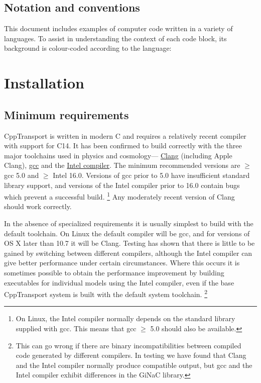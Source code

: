 \documentclass[11pt,a4paper]{article}
\newcommand{\packagefont}{\sffamily}
\newcommand{\GiNaC}{{\packagefont GiNaC}}
\newcommand{\CppTransport}{{\packagefont CppTransport}}
\newcommand{\semibold}[1]{{\fontseries{b}\selectfont{#1}}}
\newcommand{\para}[1]{\par\vspace{2mm}\noindent\semibold{{#1.}---}\ignorespaces}
\newcommand\CC{C\nolinebreak\hspace{-.05em}\raisebox{.4ex}{\relsize{-3}{\textbf{+}}}\nolinebreak\hspace{-.10em}\raisebox{.4ex}{\relsize{-3}{\textbf{+}}}}
\renewcommand{\geq}{\geqslant}
\begin{document}
\subsection{Notation and conventions}
This document includes examples of computer code written in a variety
of languages.
To assist in understanding the context of each code block, its background
is colour-coded according to the language:

\section{Installation}

\subsection{Minimum requirements}

\para{Compiler}
{\CppTransport} is written in modern {\CC} and requires a relatively recent compiler
with support for {\CC}14.
It has been confirmed to build
correctly with the three major toolchains used in physics and cosmology---%
\href{http://clang.llvm.org}{Clang}
(including Apple Clang),
\href{https://gcc.gnu.org}{gcc} and the
\href{https://software.intel.com/en-us/c-compilers}{Intel compiler}.
The minimum recommended versions
are $\geq$ gcc 5.0
and $\geq$ Intel 16.0.
Versions of gcc prior to 5.0 have insufficient standard library support,
and versions of the Intel compiler prior to 16.0
contain bugs which prevent a successful build.%
    \footnote{On Linux, the Intel compiler normally depends on the
    standard library supplied with gcc.
    This means that gcc $\geq$ 5.0 should also be available.}
Any moderately recent version of Clang should work correctly.

In the absence of specialized requirements
it is usually simplest to build with the default
toolchain.
On Linux the default compiler
will be gcc, and for versions of OS X later than 10.7
it will be Clang.
Testing has shown that there is little to be gained by switching between
different compilers, although the Intel compiler can give better performance
under certain circumstances.
Where this occurs
it is sometimes possible to obtain the performance improvement
by building executables for individual models using the Intel compiler,
even if the base {\CppTransport} system is built with the default system
toolchain.%
    \footnote{This can go wrong if there are binary incompatibilities
    between compiled code generated by different compilers.
    In testing we have found that Clang and the Intel compiler normally
    produce compatible output, but gcc and the Intel compiler
    exhibit differences in the {\GiNaC} library.}
\end{document}

